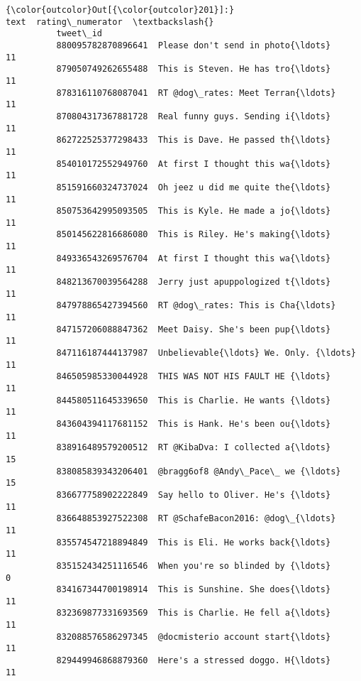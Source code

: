 \documentclass[11pt]{article}
\begin{document}
\begin{Verbatim}[commandchars=\\\{\}]
{\color{outcolor}Out[{\color{outcolor}201}]:}                                              text  rating\_numerator  \textbackslash{}
          tweet\_id                                                              
          880095782870896641  Please don't send in photo{\ldots}                11   
          879050749262655488  This is Steven. He has tro{\ldots}                11   
          878316110768087041  RT @dog\_rates: Meet Terran{\ldots}                11   
          870804317367881728  Real funny guys. Sending i{\ldots}                11   
          862722525377298433  This is Dave. He passed th{\ldots}                11   
          854010172552949760  At first I thought this wa{\ldots}                11   
          851591660324737024  Oh jeez u did me quite the{\ldots}                11   
          850753642995093505  This is Kyle. He made a jo{\ldots}                11   
          850145622816686080  This is Riley. He's making{\ldots}                11   
          849336543269576704  At first I thought this wa{\ldots}                11   
          848213670039564288  Jerry just apuppologized t{\ldots}                11   
          847978865427394560  RT @dog\_rates: This is Cha{\ldots}                11   
          847157206088847362  Meet Daisy. She's been pup{\ldots}                11   
          847116187444137987  Unbelievable{\ldots} We. Only. {\ldots}                11   
          846505985330044928  THIS WAS NOT HIS FAULT HE {\ldots}                11   
          844580511645339650  This is Charlie. He wants {\ldots}                11   
          843604394117681152  This is Hank. He's been ou{\ldots}                11   
          838916489579200512  RT @KibaDva: I collected a{\ldots}                15   
          838085839343206401  @bragg6of8 @Andy\_Pace\_ we {\ldots}                15   
          836677758902222849  Say hello to Oliver. He's {\ldots}                11   
          836648853927522308  RT @SchafeBacon2016: @dog\_{\ldots}                11   
          835574547218894849  This is Eli. He works back{\ldots}                11   
          835152434251116546  When you're so blinded by {\ldots}                 0   
          834167344700198914  This is Sunshine. She does{\ldots}                11   
          832369877331693569  This is Charlie. He fell a{\ldots}                11   
          832088576586297345  @docmisterio account start{\ldots}                11   
          829449946868879360  Here's a stressed doggo. H{\ldots}                11   

\end{Verbatim}
\end{document}
